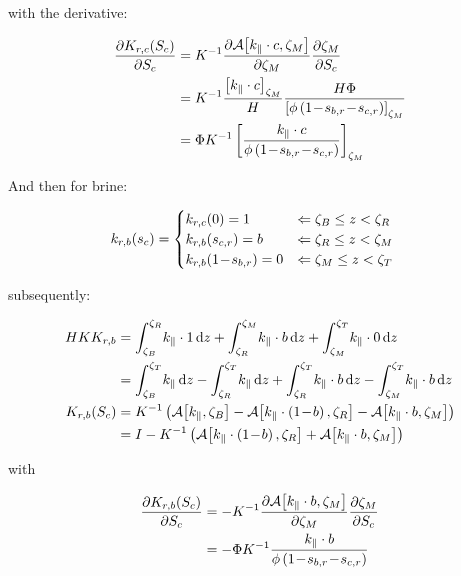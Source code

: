 \documentclass[12pt]{scrartcl}
\newcommand{\aleft}{\mathopen{}\mathclose\bgroup\left}  %
\newcommand{\aright}{\aftergroup\egroup\right}          %
\newcommand{\binop}[3]{#1\mkern1mu{#2}\mkern1mu #3}     %
\newcommand{\dual}[1]{\binop{1}{-}{#1}}                 %
\newcommand{\ddual}[2]{\binop{\binop{1}{-}{#1}}{-}{#2}} %
\newcommand{\at}[2]{\left[ #1 \right]_{#2}}             %
\newcommand{\der}[2]{\frac{\partial{#1}}{\partial{#2}}}       %
\newcommand{\intg}[4]{\int_{#1}^{#2}\!{#3}\,\mathrm{d}{#4}}   %
\newcommand{\inv}[1]{{#1}^{-1}}                               %
\newcommand{\latr}[1]{{#1}_{\|}}                              %
\newcommand{\Hei}{H}        %
\newcommand{\Por}{\Phi}     %
\newcommand{\por}{\phi}     %
\newcommand{\Sat}{S}        %
\newcommand{\sat}{s}        %
\newcommand{\sr}[1]{\sat_{#1,r}}    %
\newcommand{\Prm}{K}        %
\newcommand{\prm}{k}        %
\newcommand{\Rlp}[1]{K_{r,#1}}  %
\newcommand{\rlp}[1]{k_{r,#1}}  %
\newcommand{\Lev}{\zeta}    %
\newcommand{\Top}{T}        %
\newcommand{\Bot}{B}        %
\newcommand{\Res}{R}        %
\newcommand{\Mob}{M}        %
\newcommand{\dph}{z}        %
\newcommand{\nap}{c}        %
\newcommand{\wet}{b}        %
\newcommand{\avg}[2]{\mathcal{A}\aleft[#1, #2\aright]}  %
\newcommand{\krnwr}{c}      %
\newcommand{\krwnr}{b}      %
\newcommand{\Satn}{\Sat_\nap}
\newcommand{\satn}{\sat_\nap}
\newcommand{\snr}{\sr{\nap}}    %
\newcommand{\swr}{\sr{\wet}}    %
\newcommand{\LevT}{\Lev_\Top}
\newcommand{\LevB}{\Lev_\Bot}
\newcommand{\LevM}{\Lev_\Mob}
\newcommand{\LevR}{\Lev_\Res}
\newcommand{\Rlpn}{\Rlp{\nap}}  %
\newcommand{\rlpn}{\rlp{\nap}}
\newcommand{\Rlpw}{\Rlp{\wet}}  %
\newcommand{\rlpw}{\rlp{\wet}}
\newcommand{\Absprm}{\Prm}          %
\newcommand{\absprm}{\latr{\prm}}   %
\begin{document}
with the derivative:

\begin{align}
\der{ \Rlpn \aleft( \Satn \aright) }{ \Satn } &= \inv{ \Absprm } \der{ \avg{ \absprm \cdot \krnwr }{ \LevM } }{ \LevM } \der{ \LevM }{ \Satn } \\
&= \inv{ \Absprm } \frac{ \at{ \absprm \cdot \krnwr }{ \LevM }}{ \Hei } \frac{ \Hei \Por }{ \at{ \por \left( \ddual{ \swr }{ \snr } \right) }{ \LevM }} \\
&= \Por \inv{ \Absprm } \at{ \frac{ \absprm \cdot \krnwr }{ \por \left( \ddual{ \swr }{ \snr } \right) } }{ \LevM }
\end{align}

And then for brine:

\begin{align}
\rlpw \aleft( \satn \aright) &=
\begin{cases}
\rlpn \aleft( 0 \aright) = 1 & \Leftarrow \LevB \leq \dph < \LevR \\
\rlpw \aleft( \snr \aright) = \krwnr & \Leftarrow \LevR \leq \dph < \LevM \\
\rlpw \aleft( \dual{ \swr } \aright) = 0 & \Leftarrow \LevM \leq \dph < \LevT
\end{cases}
\end{align}

subsequently:

\begin{align}
\Hei \Absprm \Rlpw &= \intg{ \LevB }{ \LevR }{ \absprm \cdot 1 }{ \dph } + \intg{ \LevR }{ \LevM }{ \absprm \cdot \krwnr }{ \dph } + \intg{ \LevM }{ \LevT }{ \absprm \cdot 0 }{ \dph } \\
&= \intg{ \LevB }{ \LevT }{ \absprm }{ \dph } - \intg{ \LevR }{ \LevT }{ \absprm }{ \dph } + \intg{ \LevR }{ \LevT }{ \absprm \cdot \krwnr }{ \dph } - \intg{ \LevM }{ \LevT }{ \absprm \cdot \krwnr }{ \dph } \\
\Rlpw \aleft( \Satn \aright) &= \inv{ \Absprm } \left( \avg{ \absprm }{ \LevB } - \avg{ \absprm \cdot \left( \dual{ \krwnr } \right) }{ \LevR } - \avg{ \absprm \cdot \krwnr }{ \LevM } \right) \\
&= I - \inv{ \Absprm } \left( \avg{ \absprm \cdot \left( \dual{ \krwnr } \right) }{ \LevR } + \avg{ \absprm \cdot \krwnr }{ \LevM } \right)
\end{align}

with

\begin{align}
\der{ \Rlpw \aleft( \Satn \aright) }{ \Satn } &= - \inv{ \Absprm } \der{ \avg{ \absprm \cdot \krwnr }{ \LevM } }{ \LevM } \der{ \LevM }{ \Satn } \\
&= - \Por \inv{ \Absprm } \frac{ \absprm \cdot \krwnr }{ \por \left( \ddual{ \swr }{ \snr } \right) }
\end{align}
\end{document}

